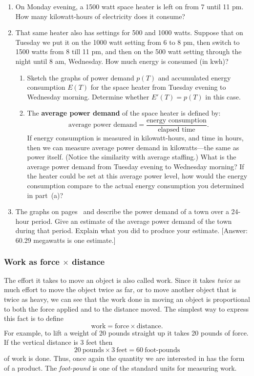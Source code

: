 \begin{enumerate}
\item On Monday evening, a 1500 watt space heater is left on from 7 until 11 pm.  How many kilowatt-hours of electricity does it consume?


\item That same heater also has settings for 500 and 1000 watts.  Suppose that on Tuesday we put it on the 1000 watt setting from 6 to 8 pm, then switch to 1500 watts from 8 till 11 pm, and then on the 500 watt setting through the night until 8 am, Wed\-nesday.  How much energy is consumed (in kwh)?

  \begin{enumerate}
  \item Sketch the graphs of power demand $p(T)$ and accumulated energy consumption $E(T)$ for the space heater from Tuesday evening to Wed\-nesday morning.  Determine whether $E'(T) = p(T)$ in this case.

  \item The {\bf average power demand} of the space heater is defined by:
\[
\text{average power demand} =
		\dfrac{\text{energy consumption}}{\text{elapsed time}}.
\]
If energy consumption is measured in kilowatt-hours, and time in
hours, then we can measure average power demand in kilowatts---the
same as power itself.  (Notice the similarity with average staffing.)
What is the average power demand from Tuesday evening to Wednesday
morning?  If the heater could be set at this average power level, how
would the energy consumption compare to the actual energy consumption
you determined in part~(a)?


\end{enumerate}
\item The graphs on pages~\pageref{pow1} and \pageref{pow2} describe the power demand of a town over a 24-hour period.  Give an estimate of the average power demand of the town during that period.  Explain what you did to produce your estimate.  \hfill [Answer: 60.29 megawatts is one estimate.]

\end{enumerate}
\subsubsection{Work as force $\times$ distance}
\label{subsubsec:work-as-force-times-distance}

The effort it takes to move an object is also called work.  Since it
takes {\em twice\/} as much effort to move the object twice as far, or
to move another object that is twice as heavy, we can see that the
work done in moving an object is proportional to both the force
applied and to the distance moved.  The simplest way to express this
fact is to define
\[
\mbox{work} = \mbox{force} \times \mbox{distance}.
\]
For example, to lift a weight of 20 pounds straight up it takes 20
pounds of force.  If the vertical distance is 3 feet then
\[
20 \ \mbox{pounds} \times 3 \ \mbox{feet} =
		60 \ \mbox{foot-pounds}
\]
of work is done.  Thus, once again the quantity we are interested in
has the form of a product.  The {\em foot-pound\/} is one of the
standard units for measuring work.


